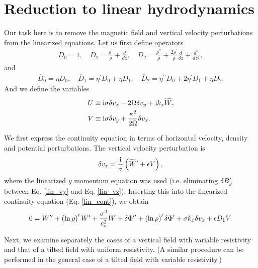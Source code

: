\section{Reduction to linear hydrodynamics}\label{reduction} 
Our task here is to remove the magnetic field and vertical velocity
perturbations from the linearized equations. Let us first define operators
\begin{align}
  D_0 = 1, \quad D_1 = \frac{\rho^\prime}{\rho} + \frac{d}{dz}, \quad
  D_2 = \frac{\rho^{\prime\prime}}{\rho} +
  \frac{2\rho^\prime}{\rho}\frac{d}{dz} + \frac{d^2}{d z^2},
\end{align}
and 
\begin{align}
  \overline{D}_0 = \eta D_0, \quad \overline{D}_1 = \eta^\prime D_0 + \eta
  D_1,\quad \overline{D}_2 = \eta^{\prime\prime} D_0 + 2\eta^\prime D_1 +
  \eta D_2. 
\end{align}
And we define the variables
\begin{align}
  &U \equiv \mathrm{i}\sigma\delta v_x - 2\Omega\delta v_y + \mathrm{i} k_x \widetilde{W},\\
  &V \equiv \mathrm{i}\sigma\delta v_y + \frac{\kappa^2}{2\Omega}\delta v_x.
\end{align}

We first express the continuity equation in terms of horizontal
velocity, density and potential perturbations. 
The vertical velocity perturbation is 
\begin{align}
  \delta v_z = \frac{\mathrm{i}}{\sigma}\left(\widetilde{W}^\prime + \epsilon V\right),  
\end{align}
where the linearized $y$ momentum equation was used (i.e. eliminating
$\delta B_y^\prime$ between Eq. \ref{lin_vy} and Eq. \ref{lin_vz}). 
Inserting this into the linearized continuity equation
(Eq. \ref{lin_cont}), we obtain
\begin{align}
0 = W^{\prime\prime} + \left(\ln{\rho}\right)^\prime W^\prime +
\frac{\sigma^2}{c_s^2}W +  \delta \Phi^{\prime\prime} + \left(\ln{\rho}\right)^\prime \delta \Phi^\prime
 + \sigma k_x \delta v_x + \epsilon D_1 V.
\end{align}

Next, we examine separately the cases of a vertical field with
variable resistivity and that of a tilted field with uniform
resistivity. (A similar procedure can be performed in
the general case of a tilted field with variable resistivity.) 

